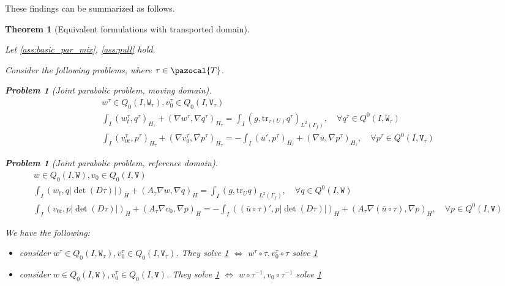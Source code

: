 \documentclass[english,a4paper,9pt,oneside]{scrbook}	%
\theoremstyle{break}
\newtheorem{thm}[equation]{Theorem}
\newtheorem{pb}[equation]{Problem}
\theoremstyle{remark}
\newcommand{\tr}{\text{tr}}
\newcommand{\cT}{\pazocal{T}}
\newcommand{\tw}[1]{\texttt{#1}}
\begin{document}
\begin{appendices}
These findings can be summarized as follows.

\begin{thm}[Equivalent formulations with transported domain]
\label{thm:eq_pde}

Let \cref{ass:basic_par_mix}, \cref{ass:pull} hold.

Consider the following problems, where $\tau \in \cT$.

\begin{pb}[Joint parabolic problem, moving domain]
\label{pb:joint_mov}
\begin{align*}
w^\tau \in Q_0(I, \tw{W}_\tau), v_0^\tau \in Q_0(I,\tw{V}_\tau) \\
\int_I  (w^\tau_t , q^\tau)_{H_\tau}+ (\nabla w^\tau, \nabla q^\tau)_{H_\tau} = \int_I(g,\tr_{\tau(U)} q^\tau)_{L^2(\Gamma_f)}, \quad \forall q^\tau \in Q^0(I, \tw{W}_\tau) \\
\int_I (v^\tau_{0t},p^\tau)_{H_\tau} + (\nabla v_0^\tau, \nabla p^\tau)_{H_\tau}= -\int_I(\bar{u}',p^\tau)_{H_\tau}+(\nabla \bar{u}, \nabla p^\tau)_{H_\tau}, \quad \forall p^\tau \in Q^0(I, \tw{V}_\tau)
\end{align*}
\end{pb}

\begin{pb}[Joint parabolic problem, reference domain]
\label{pb:joint_ref}
\begin{align*}
w \in Q_0(I, \tw{W}), v_0 \in Q_0(I,\tw{V}) \\
\int_I ( w_t , q |\det(D\tau)|)_H+ (A_\tau\nabla w, \nabla q)_{H} =\int_I(g,\tr_{U} q)_{L^2(\Gamma_f)}, \quad \forall q \in Q^0(I, \tw{W}) \\
\int_I ( v_{0t},p |\det(D\tau)|)_H + (A_\tau \nabla v_0, \nabla p)_{H}= -\int_I((\bar{u}\circ \tau)',p|\det(D\tau)|)_{H}+(A_\tau \nabla (\bar{u} \circ \tau), \nabla p)_{H}, \quad \forall p \in Q^0(I, \tw{V})
\end{align*}
\end{pb}

We have the following:

\begin{itemize}
	\item consider $w^\tau \in Q_0(I, \tw{W}_\tau), v_0^\tau \in Q_0(I,\tw{V}_\tau)$. They solve \cref{pb:joint_mov} $\iff$ $w^\tau\circ \tau , v_0^\tau\circ \tau $ solve \cref{pb:joint_ref}
	\item consider $w \in Q_0(I, \tw{W}), v_0^\tau \in Q_0(I,\tw{V})$. They solve \cref{pb:joint_ref} $\iff$ $w\circ \tau^{-1}, v_0\circ \tau^{-1}$ solve \cref{pb:joint_mov} 


\end{itemize}
\end{thm}
\end{appendices}
\end{document}
